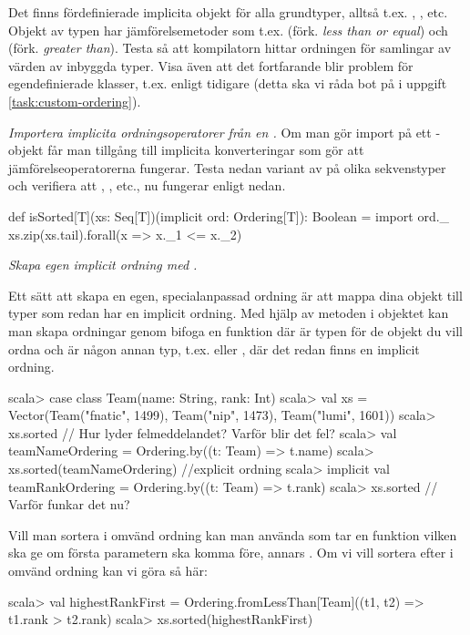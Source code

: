 Det finns fördefinierade implicita objekt  för alla grundtyper, alltså t.ex. , , etc. Objekt av typen  har jämförelsemetoder som t.ex.  (förk. \emph{less than or equal}) och  (förk. \emph{greater than}).
Testa så att kompilatorn hittar ordningen för samlingar av värden av inbyggda typer. Visa även att det fortfarande blir problem för egendefinierade klasser, t.ex.  enligt tidigare (detta ska vi råda bot på i uppgift \ref{task:custom-ordering}).

\Subtask \emph{Importera implicita ordningsoperatorer från en .} Om man gör import på ett -objekt får man tillgång till implicita konverteringar som gör att jämförelseoperatorerna fungerar. Testa nedan variant av  på olika sekvenstyper och verifiera att \code{<=}, \code{>}, etc., nu fungerar enligt nedan.
\begin{CodeSmall}
def isSorted[T](xs: Seq[T])(implicit ord: Ordering[T]): Boolean = {  
  import ord._
  xs.zip(xs.tail).forall(x => x._1 <= x._2)
}
\end{CodeSmall}


\Task  \label{task:custom-ordering} \emph{Skapa egen implicit ordning med .}  

\Subtask Ett sätt att skapa en egen, specialanpassad ordning är att mappa dina objekt till typer som redan har en implicit ordning. Med hjälp av metoden  i objektet  kan man skapa ordningar genom bifoga en funktion  där  är typen för de objekt du vill ordna och  är någon annan typ, t.ex.  eller , där det redan finns en implicit ordning.
\begin{REPL}
scala> case class Team(name: String, rank: Int)
scala> val xs = 
         Vector(Team("fnatic", 1499), Team("nip", 1473), Team("lumi", 1601))
scala> xs.sorted  // Hur lyder felmeddelandet? Varför blir det fel?
scala> val teamNameOrdering = Ordering.by((t: Team) => t.name)
scala> xs.sorted(teamNameOrdering)   //explicit ordning
scala> implicit val teamRankOrdering = Ordering.by((t: Team) => t.rank)
scala> xs.sorted   // Varför funkar det nu?
\end{REPL}

\Subtask Vill man sortera i omvänd ordning kan man använda 
 som tar en funktion  vilken ska ge  om första parametern ska komma före, annars . Om vi vill sortera efter  i omvänd ordning kan vi göra så här:
\begin{REPL}
scala> val highestRankFirst = 
         Ordering.fromLessThan[Team]((t1, t2) => t1.rank > t2.rank)
scala> xs.sorted(highestRankFirst)
\end{REPL}

